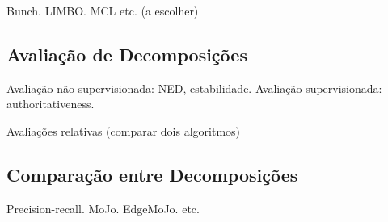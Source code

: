 \documentclass{article}
\begin{document}
Bunch. LIMBO. MCL etc. (a escolher)

\subsection{Avaliação de Decomposições}

Avaliação não-supervisionada: NED, estabilidade.
Avaliação supervisionada: authoritativeness.

Avaliações relativas (comparar dois algoritmos)

\subsection{Comparação entre Decomposições}

Precision-recall.
MoJo.
EdgeMoJo.
etc.



\end{document}
